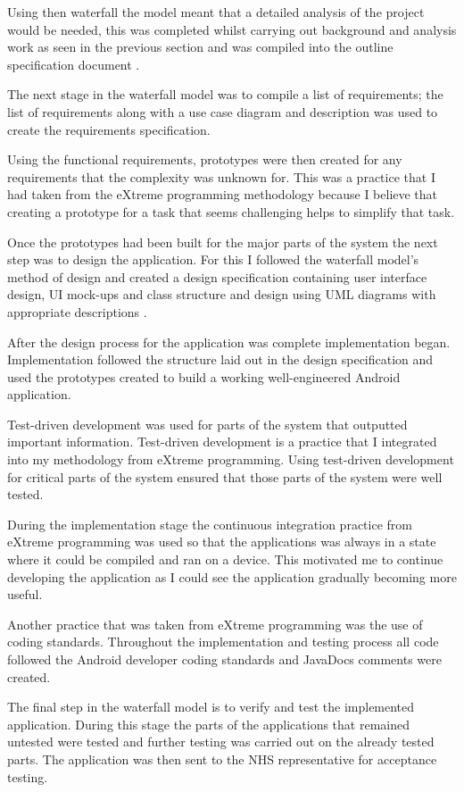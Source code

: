Using then waterfall the model meant that a detailed analysis of the project would be needed, this was completed whilst carrying out background and analysis work as seen in the previous section and was compiled into the outline specification document \cite{waterfall}.

The next stage in the waterfall model was to compile a list of requirements; the list of requirements along with a use case diagram and description was used to create the requirements specification.

Using the functional requirements, prototypes were then created for any requirements that the complexity was unknown for. This was a practice that I had taken from the eXtreme programming methodology because I believe that creating a prototype for a task that seems challenging helps to simplify that task.

Once the prototypes had been built for the major parts of the system the next step was to design the application. For this I followed the waterfall model’s method of design and created a design specification containing user interface design, UI mock-ups and class structure and design using UML diagrams with appropriate descriptions \cite{waterfall}. 

After the design process for the application was complete implementation began. Implementation followed the structure laid out in the design specification and used the prototypes created to build a working well-engineered Android application.

Test-driven development was used for parts of the system that outputted important information. Test-driven development is a practice that I integrated into my methodology from eXtreme programming. Using test-driven development for critical parts of the system ensured that those parts of the system were well tested.

During the implementation stage the continuous integration practice from eXtreme programming was used so that the applications was always in a state where it could be compiled and ran on a device. This motivated me to continue developing the application as I could see the application gradually becoming more useful.

Another practice that was taken from eXtreme programming \cite{xp} was the use of coding standards. Throughout the implementation and testing process all code followed the Android developer coding standards and JavaDocs comments were created.

The final step in the waterfall model \cite{waterfall} is to verify and test the implemented application. During this stage the parts of the applications that remained untested were tested and further testing was carried out on the already tested parts. The application was then sent to the NHS representative for acceptance testing.


